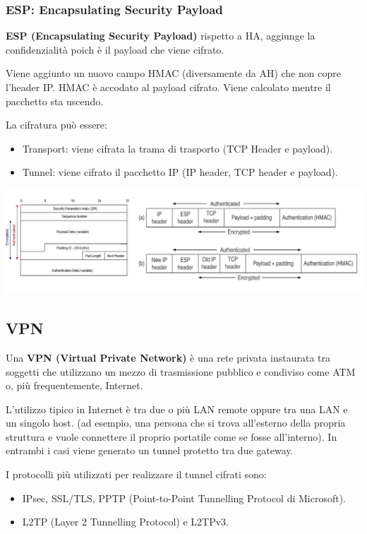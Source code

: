         \subsubsection{ESP: Encapsulating Security Payload}
            \textbf{ESP (Encapsulating Security Payload)} rispetto a HA, aggiunge la confidenzialità poich è il payload che viene cifrato.
        
            Viene aggiunto un nuovo campo HMAC (diversamente da AH) che non copre l'header IP. HMAC è accodato al payload cifrato. Viene calcolato mentre il pacchetto sta uscendo.
        
            La cifratura può essere:
            \begin{itemize}
                \item Transport: viene cifrata la trama di trasporto (TCP Header e payload).
                \item Tunnel: viene cifrato il pacchetto IP (IP header, TCP header e payload).
            \end{itemize}

            \begin{center}
                \includegraphics[scale=0.3]{chapters/7/assets/schema_zza.png}
            \end{center}

    \subsection{VPN}
        Una \textbf{VPN (Virtual Private Network)} è una rete privata instaurata tra soggetti che utilizzano un mezzo di trasmissione pubblico e condiviso come ATM o, più frequentemente, Internet.
    
        L'utilizzo tipico in Internet è tra due o più LAN remote oppure tra una LAN e un singolo host. (ad esempio, una persona che si trova all'esterno della propria struttura e vuole connettere il proprio portatile come se fosse all'interno). In entrambi i casi viene generato un tunnel protetto tra due gateway.
    
        I protocolli più utilizzati per realizzare il tunnel cifrati sono:
        \begin{itemize}
            \item IPsec, SSL/TLS, PPTP (Point-to-Point Tunnelling Protocol di Microsoft).
            \item L2TP (Layer 2 Tunnelling Protocol) e L2TPv3.
        \end{itemize}

